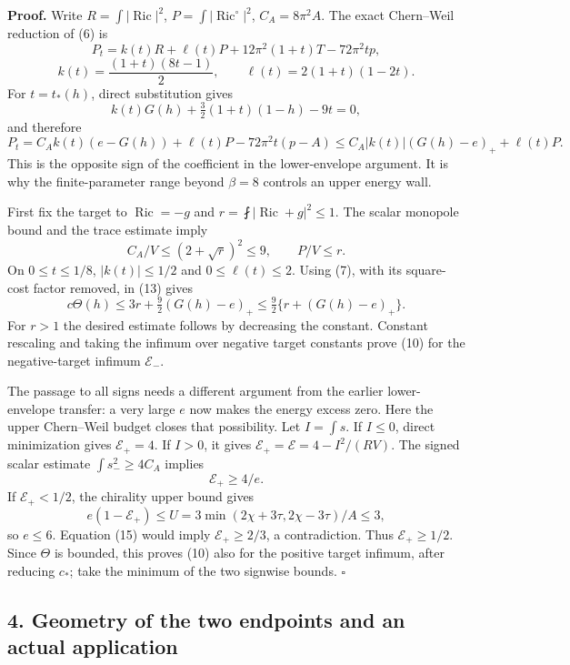 \documentclass[
  11pt,
]{article}
\begin{document}
\textbf{Proof.} Write \(R=\int|\operatorname{Ric}|^2\),
\(P=\int|\operatorname{Ric}^{\circ}|^2\), \(C_A=8\pi^2A\). The exact
Chern--Weil reduction of (6) is \[
 P_t=k(t)R+\ell(t)P+12\pi^2(1+t)T-72\pi^2tp,
\] \[
 k(t)=\frac{(1+t)(8t-1)}2,\qquad
 \ell(t)=2(1+t)(1-2t).                                  \tag{12}
\] For \(t=t_*(h)\), direct substitution gives \[
 k(t)G(h)+\tfrac32(1+t)(1-h)-9t=0,
\] and therefore \[
 P_t=C_A k(t)(e-G(h))+\ell(t)P-72\pi^2t(p-A)
       \le C_A|k(t)|(G(h)-e)_++\ell(t)P.                \tag{13}
\] This is the opposite sign of the coefficient in the lower-envelope
argument. It is why the finite-parameter range beyond \(\beta=8\)
controls an upper energy wall.

First fix the target to \(\operatorname{Ric}=-g\) and
\(r=\fint|\operatorname{Ric}+g|^2\le1\). The scalar monopole bound and
the trace estimate imply \[
 C_A/V\le(2+\sqrt r)^2\le9,\qquad P/V\le r.
\] On \(0\le t\le1/8\), \(|k(t)|\le1/2\) and \(0\le\ell(t)\le2\). Using
(7), with its square-cost factor removed, in (13) gives \[
 c\Theta(h)\le3r+\tfrac92(G(h)-e)_+
              \le\tfrac92\{r+(G(h)-e)_+\}.             \tag{14}
\] For \(r>1\) the desired estimate follows by decreasing the constant.
Constant rescaling and taking the infimum over negative target constants
prove (10) for the negative-target infimum \(\mathcal E_-\).

The passage to all signs needs a different argument from the earlier
lower-envelope transfer: a very large \(e\) now makes the energy excess
zero. Here the upper Chern--Weil budget closes that possibility. Let
\(I=\int s\). If \(I\le0\), direct minimization gives
\(\mathcal E_+=4\). If \(I>0\), it gives
\(\mathcal E_+=\mathcal E=4-I^2/(RV)\). The signed scalar estimate
\(\int s_-^2\ge4C_A\) implies \[
 \mathcal E_+\ge4/e.                                   \tag{15}
\] If \(\mathcal E_+<1/2\), the chirality upper bound gives \[
 e(1-\mathcal E_+)\le
 U=3\min(2\chi+3\tau,2\chi-3\tau)/A\le3,
\] so \(e\le6\). Equation (15) would imply \(\mathcal E_+\ge2/3\), a
contradiction. Thus \(\mathcal E_+\ge1/2\). Since \(\Theta\) is bounded,
this proves (10) also for the positive target infimum, after reducing
\(c_*\); take the minimum of the two signwise bounds. \(\square\)

\hypertarget{geometry-of-the-two-endpoints-and-an-actual-application}{%
\subsection{4. Geometry of the two endpoints and an actual
application}\label{geometry-of-the-two-endpoints-and-an-actual-application}}
\end{document}
